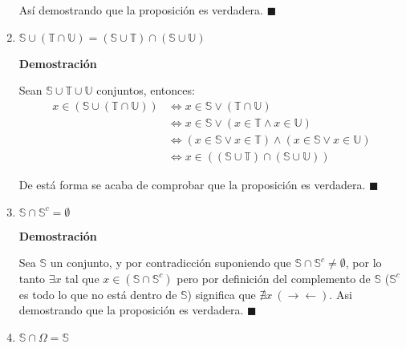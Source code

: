 \documentclass[a4paper,dvipsnames]{book}
\begin{document}
\begin{enumerate}
                Así demostrando que la proposición es verdadera. $\blacksquare$

                \item $\mathbb S\cup(\mathbb T\cap \mathbb U)=(\mathbb S\cup
                    \mathbb T)\cap(\mathbb S\cup \mathbb U)$

                \textbf{Demostración}

                Sean $\mathbb S\cup\mathbb T\cup\mathbb U$ conjuntos, entonces:
                \begin{equation*}

                \begin{split}
                    x\in\left(\mathbb S\cup\left(\mathbb T\cap \mathbb
                    U\right)\right)&\iff x\in\mathbb S\lor\left(\mathbb
                    T\cap\mathbb U\right)\\
                    &\iff x\in\mathbb S\lor\left(x\in\mathbb T\land x\in\mathbb
                    U\right)\\
                    &\iff \left(x\in\mathbb S\lor x\in\mathbb
                    T\right)\land\left(x\in\mathbb S\lor x\in\mathbb U\right)\\
                    &\iff x \in\left(\left(\mathbb S\cup\mathbb
                    T\right)\cap\left(\mathbb S\cup\mathbb U\right)\right)
                \end{split}
                \end{equation*}

                De está forma se acaba de comprobar que la proposición es
                verdadera. $\blacksquare$

                \item $\mathbb S\cap \mathbb S^{c}=\emptyset$

                \textbf{Demostración}

                Sea $\mathbb S$ un conjunto, y por contradicción suponiendo que
                $\mathbb S\cap\mathbb S^{c}\ne\emptyset$, por lo tanto $\exists
                x$ tal que $x\in\left(\mathbb S\cap\mathbb S^{c}\right)$ pero
                por definición del complemento de $\mathbb S$ ($\mathbb S^{c}$
                es todo lo que no está dentro de $\mathbb S$) significa que
                $\nexists x\ \left(\to\gets\right)$. Asi demostrando que la
                proposición es verdadera. $\blacksquare$

                \item $\mathbb S\cap \Omega=\mathbb S$


\end{enumerate}
\end{document}
